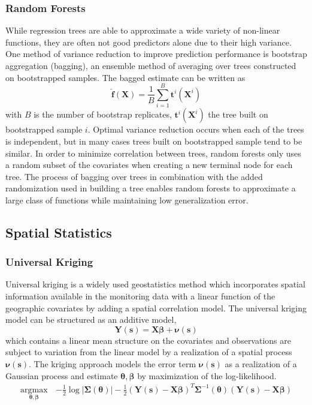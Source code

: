 \documentclass[12pt]{article}
\newcommand{\proc}{\mathbf{Y}(\mathbf{s})}
\newcommand{\covs}{\mathbf{X}}
\newcommand{\spproc}{\boldsymbol{\nu}(\mathbf{s})}
\newcommand{\pars}{\boldsymbol{\theta}}
\newcommand{\Sig}{\boldsymbol{\Sigma}}
\newcommand{\bbeta}{\boldsymbol{\beta}}
\begin{document}
\subsubsection{Random Forests}
\label{randforest}

While regression trees are able to approximate a wide variety of non-linear functions, they are often not good predictors alone due to their high variance. One method of variance reduction to improve prediction performance is bootstrap aggregation (bagging), an ensemble method of averaging over trees constructed on bootstrapped samples. The bagged estimate can be written as
$$ \mathbf{\hat f}({\covs}) = \frac{1}{B}\sum\limits_{i=1}^B \mathbf{t}^i(\covs^i)$$
with $B$ is the number of bootstrap replicates, $\mathbf{t}^i(\covs^i)$ the tree built on bootstrapped sample $i$. Optimal variance reduction occurs when each of the trees is independent, but in many cases trees built on bootstrapped sample tend to be similar. In order to minimize correlation between trees, random forests only uses a random subset of the covariates when creating a new terminal node for each tree. The process of bagging over trees in combination with the added randomization used in building a tree enables random forests to approximate a large class of functions while maintaining low generalization error.

\subsection{Spatial Statistics}

\subsubsection{Universal Kriging}
\label{univkrig}

Universal kriging is a widely used geostatistics method which incorporates spatial information available in the monitoring data with a linear function of the geographic covariates by adding a spatial correlation model. The universal kriging model can be structured as an additive model,
$$\proc = \covs \bbeta + \spproc$$ 
which contains a linear mean structure on the covariates and observations are subject to variation from the linear model by a realization of a spatial process $\spproc$. The kriging approach models the error term $\spproc$ as a realization of a Gaussian process and estimate $\pars, \bbeta$ by maximization of the log-likelihood.
\begin{align}
\underset{ \pars, \bbeta }{\text{argmax} } \, &-\frac{1}{2} \log | \Sig(\pars) | - \frac{1}{2} ( \proc - \covs \bbeta )^T \boldsymbol {\Sigma}^{-1} (\pars) (\proc- \covs \bbeta) \nonumber 
\end{align} 
\end{document}
